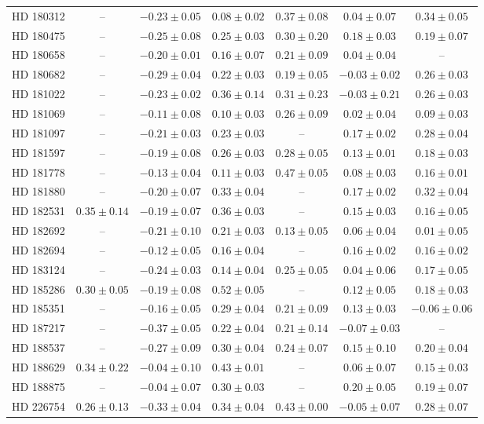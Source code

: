 \begin{table*}
\begin{tabular}{ccccccc}
HD 180312 & -- & $-0.23 \pm 0.05$ & $0.08 \pm 0.02$ & $0.37 \pm 0.08$ & $0.04 \pm 0.07$ & $0.34 \pm 0.05$ \\
HD 180475 & -- & $-0.25 \pm 0.08$ & $0.25 \pm 0.03$ & $0.30 \pm 0.20$ & $0.18 \pm 0.03$ & $0.19 \pm 0.07$ \\
HD 180658 & -- & $-0.20 \pm 0.01$ & $0.16 \pm 0.07$ & $0.21 \pm 0.09$ & $0.04 \pm 0.04$ & -- \\
HD 180682 & -- & $-0.29 \pm 0.04$ & $0.22 \pm 0.03$ & $0.19 \pm 0.05$ & $-0.03 \pm 0.02$ & $0.26 \pm 0.03$ \\
HD 181022 & -- & $-0.23 \pm 0.02$ & $0.36 \pm 0.14$ & $0.31 \pm 0.23$ & $-0.03 \pm 0.21$ & $0.26 \pm 0.03$ \\
HD 181069 & -- & $-0.11 \pm 0.08$ & $0.10 \pm 0.03$ & $0.26 \pm 0.09$ & $0.02 \pm 0.04$ & $0.09 \pm 0.03$ \\
HD 181097 & -- & $-0.21 \pm 0.03$ & $0.23 \pm 0.03$ & -- & $0.17 \pm 0.02$ & $0.28 \pm 0.04$ \\
HD 181597 & -- & $-0.19 \pm 0.08$ & $0.26 \pm 0.03$ & $0.28 \pm 0.05$ & $0.13 \pm 0.01$ & $0.18 \pm 0.03$ \\
HD 181778 & -- & $-0.13 \pm 0.04$ & $0.11 \pm 0.03$ & $0.47 \pm 0.05$ & $0.08 \pm 0.03$ & $0.16 \pm 0.01$ \\
HD 181880 & -- & $-0.20 \pm 0.07$ & $0.33 \pm 0.04$ & -- & $0.17 \pm 0.02$ & $0.32 \pm 0.04$ \\
HD 182531 & $0.35 \pm 0.14$ & $-0.19 \pm 0.07$ & $0.36 \pm 0.03$ & -- & $0.15 \pm 0.03$ & $0.16 \pm 0.05$ \\
HD 182692 & -- & $-0.21 \pm 0.10$ & $0.21 \pm 0.03$ & $0.13 \pm 0.05$ & $0.06 \pm 0.04$ & $0.01 \pm 0.05$ \\
HD 182694 & -- & $-0.12 \pm 0.05$ & $0.16 \pm 0.04$ & -- & $0.16 \pm 0.02$ & $0.16 \pm 0.02$ \\
HD 183124 & -- & $-0.24 \pm 0.03$ & $0.14 \pm 0.04$ & $0.25 \pm 0.05$ & $0.04 \pm 0.06$ & $0.17 \pm 0.05$ \\
HD 185286 & $0.30 \pm 0.05$ & $-0.19 \pm 0.08$ & $0.52 \pm 0.05$ & -- & $0.12 \pm 0.05$ & $0.18 \pm 0.03$ \\
HD 185351 & -- & $-0.16 \pm 0.05$ & $0.29 \pm 0.04$ & $0.21 \pm 0.09$ & $0.13 \pm 0.03$ & $-0.06 \pm 0.06$ \\
HD 187217 & -- & $-0.37 \pm 0.05$ & $0.22 \pm 0.04$ & $0.21 \pm 0.14$ & $-0.07 \pm 0.03$ & -- \\
HD 188537 & -- & $-0.27 \pm 0.09$ & $0.30 \pm 0.04$ & $0.24 \pm 0.07$ & $0.15 \pm 0.10$ & $0.20 \pm 0.04$ \\
HD 188629 & $0.34 \pm 0.22$ & $-0.04 \pm 0.10$ & $0.43 \pm 0.01$ & -- & $0.06 \pm 0.07$ & $0.15 \pm 0.03$ \\
HD 188875 & -- & $-0.04 \pm 0.07$ & $0.30 \pm 0.03$ & -- & $0.20 \pm 0.05$ & $0.19 \pm 0.07$ \\
HD 226754 & $0.26 \pm 0.13$ & $-0.33 \pm 0.04$ & $0.34 \pm 0.04$ & $0.43 \pm 0.00$ & $-0.05 \pm 0.07$ & $0.28 \pm 0.07$ \\
\hline
\end{tabular}
\end{table*}
